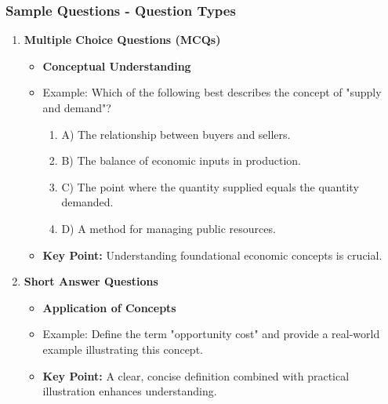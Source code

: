 \documentclass{beamer}
\begin{document}
\begin{frame}[fragile]
    \frametitle{Sample Questions - Question Types}
    \begin{enumerate}
        \item \textbf{Multiple Choice Questions (MCQs)}
        \begin{itemize}
            \item \textbf{Conceptual Understanding}
            \item Example: Which of the following best describes the concept of "supply and demand"?
            \begin{enumerate}
                \item A) The relationship between buyers and sellers.
                \item B) The balance of economic inputs in production.
                \item C) The point where the quantity supplied equals the quantity demanded.
                \item D) A method for managing public resources.
            \end{enumerate}
            \item \textbf{Key Point:} Understanding foundational economic concepts is crucial.
        \end{itemize}
        
        \item \textbf{Short Answer Questions}
        \begin{itemize}
            \item \textbf{Application of Concepts}
            \item Example: Define the term "opportunity cost" and provide a real-world example illustrating this concept.
            \item \textbf{Key Point:} A clear, concise definition combined with practical illustration enhances understanding.
        \end{itemize}
    \end{enumerate}
\end{frame}
\end{document}
